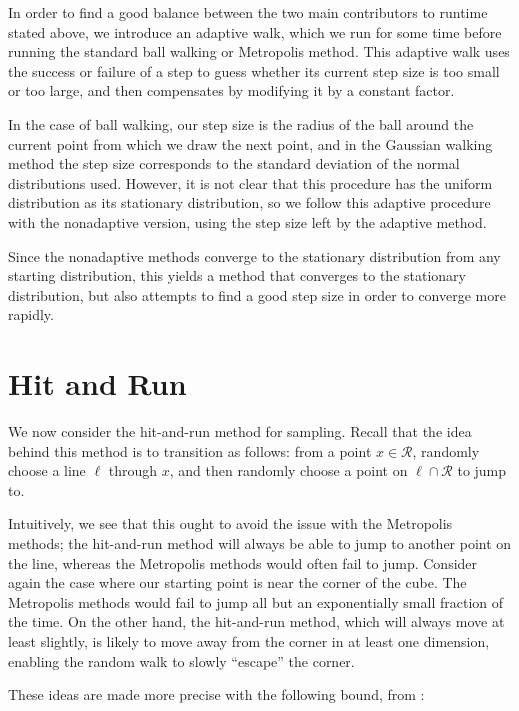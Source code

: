 \documentclass[11pt]{article}
\begin{document}
In order to find a good balance between the two main contributors to runtime stated above, we introduce an adaptive walk, which we run for some time before running the standard ball walking or Metropolis method. This adaptive walk uses the success or failure of a step to guess whether its current step size is too small or too large, and then compensates by modifying it by a constant factor. 

In the case of ball walking, our step size is the radius of the ball around the current point from which we draw the next point, and in the Gaussian walking method the step size corresponds to the standard deviation of the normal distributions used. However, it is not clear that this procedure has the uniform distribution as its stationary distribution, so we follow this adaptive procedure with the nonadaptive version, using the step size left by the adaptive method.

Since the nonadaptive methods converge to the stationary distribution from any starting distribution, this yields a method that converges to the stationary distribution, but also attempts to find a good step size in order to converge more rapidly.

\section{Hit and Run}

We now consider the hit-and-run method for sampling. Recall that the idea behind this method is to transition as follows: from a point $x \in \mathcal{R}$, randomly choose a line $\ell$ through $x$, and then randomly choose a point on $\ell \cap \mathcal{R}$ to jump to.

Intuitively, we see that this ought to avoid the issue with the Metropolis methods; the hit-and-run method will always be able to jump to another point on the line, whereas the Metropolis methods would often fail to jump. Consider again the case where our starting point is near the corner of the cube. The Metropolis methods would fail to jump all but an exponentially small fraction of the time. On the other hand, the hit-and-run method, which will always move at least slightly, is likely to move away from the corner in at least one dimension, enabling the random walk to slowly ``escape'' the corner.

These ideas are made more precise with the following bound, from \cite{Vempala}:
\end{document}
